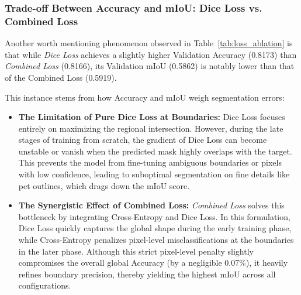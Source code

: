 \subsubsection{Trade-off Between Accuracy and mIoU: Dice Loss vs. Combined Loss}
Another worth mentioning phenomenon observed in Table~\ref{tab:loss_ablation} is that while \textit{Dice Loss} achieves a slightly higher Validation Accuracy (0.8173) than \textit{Combined Loss} (0.8166), its Validation mIoU (0.5862) is notably lower than that of the Combined Loss (0.5919). 

This instance stems from how Accuracy and mIoU weigh segmentation errors:
\begin{itemize}
    \item \textbf{The Limitation of Pure Dice Loss at Boundaries:} Dice Loss focuses entirely on maximizing the regional intersection. However, during the late stages of training from scratch, the gradient of Dice Loss can become unstable or vanish when the predicted mask highly overlaps with the target. This prevents the model from fine-tuning ambiguous boundaries or pixels with low confidence, leading to suboptimal segmentation on fine details like pet outlines, which drags down the mIoU score.
    \item \textbf{The Synergistic Effect of Combined Loss:} \textit{Combined Loss} solves this bottleneck by integrating Cross-Entropy and Dice Loss. In this formulation, Dice Loss quickly captures the global shape during the early training phase, while Cross-Entropy penalizes pixel-level misclassifications at the boundaries in the later phase. Although this strict pixel-level penalty slightly compromises the overall global Accuracy (by a negligible 0.07\%), it heavily refines boundary precision, thereby yielding the highest mIoU across all configurations.
\end{itemize}




